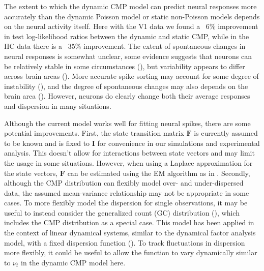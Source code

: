 \documentclass[]{article}
\begin{document}
	The extent to which the dynamic CMP model can predict neural responses more accurately than the dynamic Poisson model or static non-Poisson models depends on the neural activity itself. Here with the V1 data we found a ~6\% improvement in test log-likelihood ratios between the dynamic and static CMP, while in the HC data there is a ~35\% improvement. The extent of spontaneous changes in neural responses is somewhat unclear, some evidence suggests that neurons can be relatively stable in some circumstances (\cite{Chestek2007,Stevenson2011a,Dickey2009}), but variability appears to differ across brain areas (\cite{Mochizuki2016}). More accurate spike sorting may account for some degree of instability (\cite{Steinmetz2021}), and the degree of spontaneous changes may also depends on the brain area (\cite{Rule2019}). However, neurons do clearly change both their average responses and dispersion in many situations.
	
	Although the current model works well for fitting neural spikes, there are some potential improvements. First, the state transition matrix $\bm{F}$ is currently assumed to be known and is fixed to $\bm{I}$ for convenience in our simulations and experimental analysis. This doesn’t allow for interactions between state vectors and may limit the usage in some situations. However, when using a Laplace approximation for the state vectors, $\bm{F}$ can be estimated using the EM algorithm as in \cite{Macke2011}. Secondly, although the CMP distribution can flexibly model over- and under-dispersed data, the assumed mean-variance relationship may not be appropriate in some cases. To more flexibly model the dispersion for single observations, it may be useful to instead consider the generalized count (GC) distribution (\cite{DelCastillo2005}), which includes the CMP distribution as a special case. This model has been applied in the context of linear dynamical systems, similar to the dynamical factor analysis model,  with a fixed dispersion function (\cite{Gao2015}). To track fluctuations in dispersion more flexibly, it could be useful to allow the function to vary dynamically similar to $\nu_t$ in the dynamic CMP model here.
	
\end{document}
